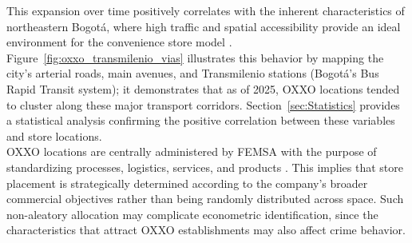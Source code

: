 \documentclass[12pt]{article}
\begin{document}
This expansion over time positively correlates with the inherent characteristics of northeastern Bogotá, where high traffic and spatial accessibility provide an ideal environment for the convenience store model \parencite{marcos2022}. Figure~\ref{fig:oxxo_transmilenio_vias} illustrates this behavior by mapping the city’s arterial roads, main avenues, and Transmilenio stations (Bogotá's Bus Rapid Transit system); it demonstrates that as of 2025, OXXO locations tended to cluster along these major transport corridors. Section~\ref{sec:Statistics} provides a statistical analysis confirming the positive correlation between these variables and store locations.\\

OXXO locations are centrally administered by FEMSA with the purpose of standardizing processes, logistics, services, and products \parencite{oxxo_faqs}. This implies that store placement is strategically determined according to the company’s broader commercial objectives rather than being randomly distributed across space. Such non-aleatory allocation may complicate econometric identification, since the characteristics that attract OXXO establishments may also affect crime behavior.\\
\end{document}
